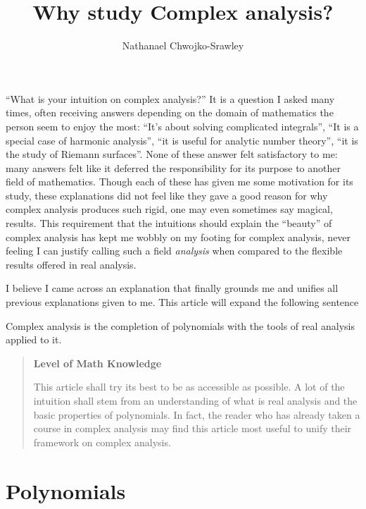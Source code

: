 \documentclass[oneside]{article}
\title{Why study Complex analysis?}
\author{Nathanael Chwojko-Srawley}
\newenvironment{titledBox}[1]
 {\begin{tcolorbox}[enhanced, sharp corners, colback=white , borderline={0.2pt}{0pt}{black}]
   \begin{quote}\textbf{#1}
   }{
   \end{quote}\end{tcolorbox}}
\begin{document}
``What is your intuition on complex analysis?'' It is a question I asked many times, often receiving answers
depending on the domain of mathematics the person seem to enjoy the most: ``It's about solving complicated
integrals'', ``It is a special case of harmonic analysis'', ``it is useful for analytic number theory'', ``it
is the study of Riemann surfaces''. None of these answer felt satisfactory to me: many answers felt like it
deferred the responsibility for its purpose to another field of mathematics. Though each of these has given me
some motivation for its study, these explanations did not feel like they gave a good reason for why complex
analysis produces such rigid, one may even sometimes say magical, results. This requirement that the
intuitions should explain the ``beauty'' of complex analysis has kept me wobbly on my footing for complex
analysis, never feeling I can justify calling such a field \emph{analysis} when compared to the flexible
results offered in real analysis.

I believe I came across an explanation that finally grounds me and unifies all previous explanations given to
me. This article will expand the following sentence
\begin{center}
  \addtolength{\leftskip}{2cm}  %
\addtolength{\rightskip}{2cm} %
  Complex analysis is the completion of polynomials with the tools of real analysis applied to it.
\end{center}

\begin{titledBox}{Level of Math Knowledge}
  This article shall try its best to be as accessible as possible. A lot of the intuition shall stem
  from an understanding of what is real analysis and the basic properties of polynomials. In fact, the reader
  who has already taken a course in complex analysis may find this article most useful to unify their
  framework on complex analysis.
\end{titledBox}

\section{Polynomials}
\end{document}

